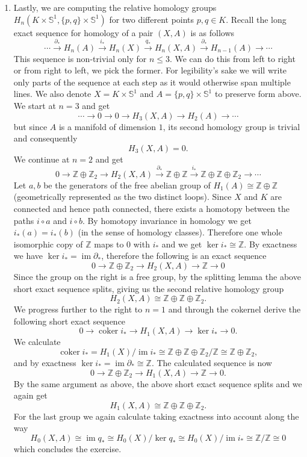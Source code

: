 \documentclass[a4paper, 12pt]{article}
\DeclareMathOperator{\im}{im}
\DeclareMathOperator{\coker}{coker}
\renewcommand{\S}{\mathbb{S}}
\newcommand{\Z}{\mathbb{Z}}
\newcommand{\iso}{\cong}
\begin{document}
\begin{enumerate}
	\item Lastly, we are computing the relative homology groups $H_n(K \times \S^1, \lbrace p, q \rbrace \times \S^1)$ for two different points $p, q \in K$. Recall the long exact sequence for homology of a pair $(X, A)$ is as follows
	\[
	\cdots \xrightarrow{\partial_*} H_n(A) \xrightarrow{i_*} H_n(X) \xrightarrow{q_*} H_n(X, A) \xrightarrow{\partial_*} H_{n-1}(A) \xrightarrow{} \cdots
	\]
	This sequence is non-trivial only for $n \leq 3$. We can do this from left to right or from right to left, we pick the former. For legibility's sake we will write only parts of the sequence at each step as it would otherwise span multiple lines. We also denote $X = K \times \S^1$ and $A = \lbrace p, q \rbrace \times \S^1$ to preserve form above. We start at $n = 3$ and get
	\[
	\cdots \xrightarrow{} 0 \xrightarrow{} 0 \xrightarrow{} H_3(X, A) \xrightarrow{} H_2(A) \xrightarrow{}\cdots
	\]
	but since $A$ is a manifold of dimension $1$, its second homology group is trivial and consequently
	\[
	H_3(X, A) = 0.
	\]
	We continue at $n=2$ and get
	\[
	0 \xrightarrow{} \Z \oplus \Z_2 \xrightarrow{} H_2(X, A) \xrightarrow{\partial_*} \Z\oplus\Z \xrightarrow{i_*} \Z\oplus\Z\oplus\Z_2 \xrightarrow{}\cdots
	\]
	Let $a, b$ be the generators of the free abelian group of $H_1(A) \iso \Z\oplus\Z$ (geometrically represented as the two distinct loops). Since $X$ and $K$ are connected and hence path connected, there exists a homotopy between the paths $i\circ a$ and $i\circ b$. By homotopy invariance in homology we get $i_*(a) = i_*(b)$ (in the sense of homology classes). Therefore one whole isomorphic copy of $\Z$ maps to $0$ with $i_*$ and we get $\ker i_* \iso \Z$. By exactness we have $\ker i_* = \im\partial_*$, therefore the following is an exact sequence
	\[
	0 \xrightarrow{} \Z\oplus\Z_2 \xrightarrow{} H_2(X, A) \xrightarrow{} \Z \xrightarrow{} 0
	\]
	Since the group on the right is a free group, by the splitting lemma the above short exact sequence splits, giving us the second relative homology group
	\[
	H_2(X, A) \iso \Z\oplus\Z\oplus\Z_2.
	\]
	We progress further to the right to $n=1$ and through the cokernel derive the following short exact sequence
	\[
	0 \xrightarrow{} \coker i_* \xrightarrow{} H_1(X, A) \xrightarrow{} \ker i_* \xrightarrow{} 0.
	\]
	We calculate
	\[
	\coker i_* = H_1(X)/\im i_* \iso \Z\oplus\Z\oplus\Z_2 / \Z \iso \Z\oplus\Z_2,
	\]
	and by exactness $\ker i_* = \im\partial_* \iso \Z$. The calculated sequence is now
	\[
	0 \xrightarrow{} \Z\oplus\Z_2 \xrightarrow{} H_1(X, A) \xrightarrow{} \Z \xrightarrow{} 0.
	\]
	By the same argument as above, the above short exact sequence splits and we again get
	\[
	H_1(X, A) \iso \Z\oplus\Z\oplus\Z_2.
	\]
	For the last group we again calculate taking exactness into account along the way
	\[
	H_0(X, A) \iso \im q_* \iso H_0(X)/\ker q_* \iso H_0(X)/\im i_* \iso \Z/\Z \iso 0
	\]
	which concludes the exercise.
\end{enumerate}
\end{document}
